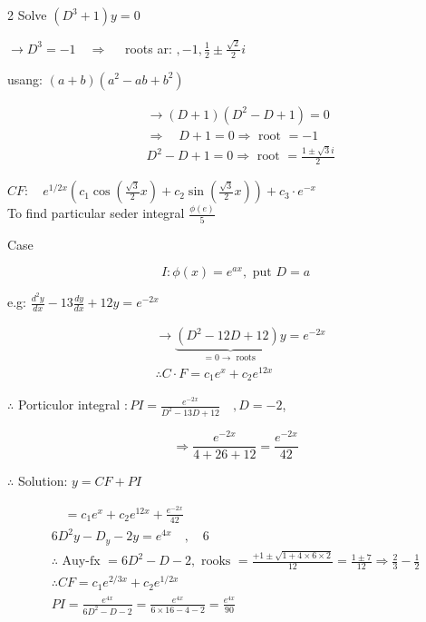 \documentclass[12pt, a4paper]{article}
\begin{document}
	2 Solve $\left(D^{3}+1\right) y=0$

	$\rightarrow D^{3}=-1 \quad \Rightarrow \quad$ roots ar: $,-1, \frac{1}{2} \pm \frac{\sqrt{2}}{2} i$

	usang: $(a+b)\left(a^{2}-a b+b^{2}\right)$

$$
\begin{aligned}
	 & \rightarrow(D+1)\left(D^{2}-D+1\right)=0                         \\
	 & \Rightarrow \quad D+1=0 \Rightarrow \text{ root }=-1             \\
	 & D^{2}-D+1=0 \Rightarrow \text{ root }=\frac{1 \pm \sqrt{3} i}{2}
\end{aligned}
$$

	$C F: \quad e^{1 / 2 x}\left(c_{1} \cos \left(\frac{\sqrt{3}}{2} x\right)+c_{2} \sin \left(\frac{\sqrt{3}}{2} x\right)\right)+c_{3} \cdot e^{-x}$\\
	To find particular seder integral $\frac{\phi(e)}{5}$

	Case

$$
I: \phi(x)=e^{a x}, \text{ put } D=a
$$

	e.g: $\frac{d^{2} y}{d x}-13 \frac{d y}{d x}+12 y=e^{-2 x}$

$$
\begin{aligned}
	 & \rightarrow \underbrace{\left(D^{2}-12 D+12\right) y}_{=0 \rightarrow \text{ roots }}=e^{-2 x} \\
	 & \therefore C \cdot F=c_{1} e^{x}+c_{2} e^{12 x}
\end{aligned}
$$

	$\therefore$ Porticulor integral $: P I=\frac{e^{-2 x}}{D^{2}-13 D+12} \quad, D=-2$,

$$
\Rightarrow \frac{e^{-2 x}}{4+26+12}=\frac{e^{-2 x}}{42}
$$

	$\therefore$ Solution: $y=C F+P I$

$$
\begin{gathered}
	\quad=c_{1} e^{x}+c_{2} e^{12 x}+\frac{e^{-2 x}}{42} \\
	6 D^{2} y-D_{y}-2 y=e^{4 x} \quad, \quad 6 \\
	\therefore \text{ Auy-fx }=6 D^{2}-D-2, \text{ rooks }=\frac{+1 \pm \sqrt{1+4 \times 6 \times 2}}{12}=\frac{1 \pm 7}{12} \Rightarrow \frac{2}{3}-\frac{1}{2} \\
	\therefore C F=c_{1} e^{2 / 3 x}+c_{2} e^{1 / 2 x} \\
	P I=\frac{e^{4 x}}{6 D^{2}-D-2}=\frac{e^{4 x}}{6 \times 16-4-2}=\frac{e^{4 x}}{90}
\end{gathered}
$$
\end{document}
